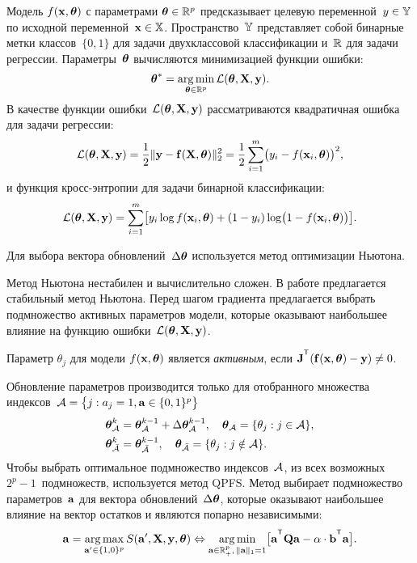 \documentclass[11pt, a5paper]{dissert}
\begin{document}
Модель $f( \mathbf{x}, \boldsymbol{\theta})$ с параметрами $\boldsymbol{\theta} \in \mathbb{R}^p$ предсказывает целевую переменной~$y \in \mathbb{Y}$ по исходной переменной~$\mathbf{x} \in \mathbb{X}$. Пространство~$\mathbb{Y}$ представляет собой бинарные метки классов~$\{0, 1\}$ для задачи двухклассовой классификации и~$\mathbb{R}$ для задачи регрессии.
Параметры~$\boldsymbol{\theta}$ вычисляются минимизацией функции ошибки:
\begin{equation}
	\boldsymbol{\theta}^* = \mathop{\arg \min}\limits_{\boldsymbol{\theta} \in \mathbb{R}^p} \mathcal{L}(\boldsymbol{\theta}, \mathbf{X}, \mathbf{y}).
	\label{ch4:eq:error_function}
\end{equation}
В качестве функции ошибки~$\mathcal{L} (\boldsymbol{\theta}, \mathbf{X}, \mathbf{y})$ рассматриваются квадратичная ошибка для задачи регрессии:
\begin{equation}
	\mathcal{L}(\boldsymbol{\theta}, \mathbf{X}, \mathbf{y}) = \frac 12 \| \mathbf{y} - \mathbf{f}(\mathbf{X}, \boldsymbol{\theta}) \|_2^2 = \frac 12 \sum_{i=1}^m \bigl( y_i - f(\mathbf{x}_i,  \boldsymbol{\theta})\bigr)^2,
	\label{ch4:eq:squared_error}
\end{equation}
и функция кросс-энтропии для задачи бинарной классификации: 
\begin{equation}
	\mathcal{L}(\boldsymbol{\theta}, \mathbf{X}, \mathbf{y}) = \sum_{i=1}^m \bigl[y_i \log f (\mathbf{x}_i , \boldsymbol{\theta}) + (1-y_i) \log \bigl(1 - f (\mathbf{x}_i , \boldsymbol{\theta})\bigr)\bigr].
	\label{ch4:eq:log_loss}
\end{equation}

Для выбора вектора обновлений~$\Delta \boldsymbol{\theta}$ используется метод оптимизации Ньютона.

Метод Ньютона нестабилен и вычислительно сложен. 
В работе предлагается стабильный метод Ньютона. 
Перед шагом градиента предлагается выбрать подмножество активных параметров модели, которые оказывают наибольшее влияние на функцию ошибки~$\mathcal{L} (\boldsymbol{\theta}, \mathbf{X}, \mathbf{y})$.
\begin{definition}
	\label{ch4:def:active_param}
	Параметр $\theta_j$ для модели $f(\mathbf{x}, \boldsymbol{\theta})$ является \textit{активным}, если $\bJ^{\T} (\mathbf{f}(\bx, \btheta) - \by) \neq 0$.
\end{definition}
Обновление параметров производится только для отобранного множества индексов~$\mathcal{A} = \bigl\{j: a_j = 1, \mathbf{a} \in \{0, 1\}^p\bigr\}$
\begin{align*}
	\boldsymbol{\theta}_{\mathcal{A}}^k &= \boldsymbol{\theta}_{\mathcal{A}}^{k - 1} + \Delta \boldsymbol{\theta}_{\mathcal{A}}^{k - 1}, \quad \boldsymbol{\theta}_{\mathcal{A}} = \{\theta_j: j \in \mathcal{A} \}, \\
	\boldsymbol{\theta}_{\bar{\mathcal{A}}}^k &= \boldsymbol{\theta}_{\bar{\mathcal{A}}}^{k - 1}, \quad \boldsymbol{\theta}_{\bar{\mathcal{A}}} = \{\theta_j: j \notin \mathcal{A} \}.
\end{align*}
Чтобы выбрать оптимальное подмножество индексов~$\mathcal{A}$, из всех возможных $2^p - 1$~подмножеств, используется метод QPFS. Метод выбирает подмножество параметров~$\mathbf{a}$ для вектора обновлений~$ \Delta \boldsymbol{\theta}$, которые оказывают наибольшее влияние на вектор остатков и являются попарно независимыми:
\begin{equation}
	\ba = \argmax_{\ba' \in \{1, 0\}^p} S(\ba', \bX, \by, \btheta) \Leftrightarrow \argmin_{\ba  \in \bbR^p_+, \, \|\ba\|_1=1} \bigl[\ba^{\T} \bQ \ba - \alpha \cdot \mathbf{b}^{\T} \ba \bigr].
\end{equation}
\end{document}
